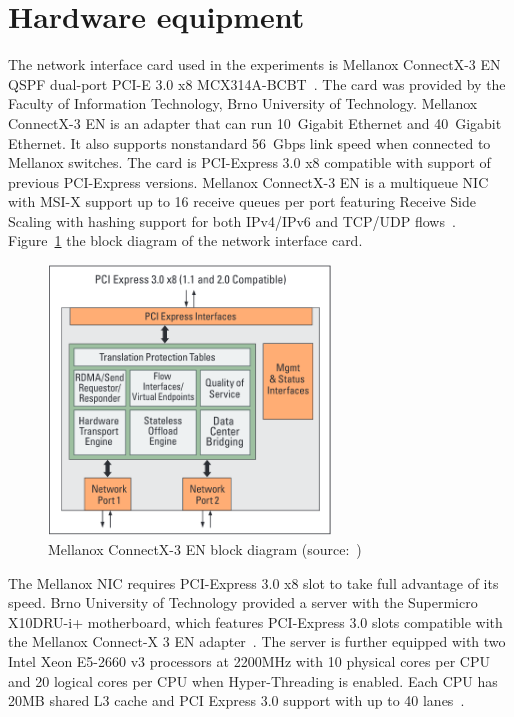 
\section{Hardware equipment}\label{sec:analysis-hardware}
The network interface card used in the experiments is
Mellanox ConnectX-3 EN QSPF dual-port PCI-E 3.0 x8 MCX314A-BCBT~\cite{mellanox-product-brief}.
The card was provided by the Faculty of Information Technology, Brno University of Technology.
Mellanox ConnectX-3 EN is an adapter that can run 10~Gigabit Ethernet and 40~Gigabit Ethernet.
It also supports nonstandard 56~Gbps link speed when connected to Mellanox switches.
The card is PCI-Express 3.0 x8 compatible with support of previous PCI-Express versions.
Mellanox ConnectX-3 EN is a multiqueue NIC with MSI-X support up to 16 receive queues per port
featuring Receive Side Scaling with hashing support for both IPv4/IPv6 and TCP/UDP flows~\cite{mellanox-silicon, mellanox-user-manual}.
Figure~\ref{fig:setup-mlx-block-diagram} the block diagram of the network interface card.

\begin{figure}
	\centering
	\includegraphics[width=7.5cm,keepaspectratio]{fig/mlx-block-diagram.png}
	\caption{Mellanox ConnectX-3 EN block diagram (source:~\cite{mellanox-silicon})}
	\label{fig:setup-mlx-block-diagram}
	\bigskip
\end{figure}

The Mellanox NIC requires PCI-Express 3.0 x8 slot to take full advantage of its speed.
Brno University of Technology provided a server with
the Supermicro X10DRU-i+ motherboard, which
features PCI-Express 3.0 slots compatible with the Mellanox Connect-X 3 EN adapter~\cite{supermicro-board}.
The server is further equipped with two Intel Xeon E5-2660 v3 processors at 2200MHz with 10 physical cores per CPU
and 20 logical cores per CPU when Hyper-Threading is enabled.
Each CPU has 20MB shared L3 cache and PCI Express 3.0 support with up to 40 lanes~\cite{intel-xeon-cpu}.

